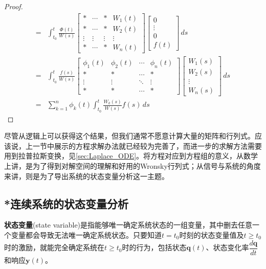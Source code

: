 \documentclass{ctexbook}
\begin{document}
\begin{proof}
\begin{align*}
        =&\int_{t_0}^t \frac{\Phi(t)}{W(s)}\begin{bmatrix}
        * & \cdots & * & W_1(t)\\
        * &  \cdots & * & W_2(t)\\
        \vdots & \vdots & \vdots & \vdots\\
        * &  \cdots & * & W_n(t)
        \end{bmatrix}\begin{bmatrix}
        0\\
        \vdots\\
        0\\
        f(t)
        \end{bmatrix}\,ds\\
        =&\int_{t_0}^t \frac{f(s)}{W(s)}\begin{bmatrix}
        \phi_1(t) & \phi_2(t) & \cdots & \phi_n(t)\\
        * & * & \cdots & *\\
        \vdots & \vdots & \ddots & \vdots\\
        * & * & \cdots & *
        \end{bmatrix}\begin{bmatrix}
        W_1(s)\\
        W_2(s)\\
        \vdots\\
        W_n(s)
        \end{bmatrix}\,ds\\
        =&\sum_{k=1}^n \phi_k(t)\int_{t_0}^t \frac{W_k(s)}{W(s)}f(s)\,ds
    \end{align*}
\end{proof}
\begin{remark}
    尽管从逻辑上可以获得这个结果，但我们通常不愿意计算大量的矩阵和行列式。应该说，上一节中展示的方程求解办法就已经较为完善了，而进一步的求解方法需要用到拉普拉斯变换，见\ref{sec:Laplace_ODE}。将方程对应到方程组的意义，从数学上讲，是为了得到对解空间的理解和好用的Wronsky行列式；从信号与系统的角度来讲，则是为了导出系统的状态变量分析这一主题。
\end{remark}

\subsection{*连续系统的状态变量分析}\label{sub:state_variable_analysis}

\begin{definition}[状态变量]
    \textbf{状态变量}(state variable)是指能够唯一确定系统状态的一组变量，其中删去任意一个变量都会导致无法唯一确定系统状态。只要知道$t=t_0$时刻的状态变量值及$t\geq t_0$时的激励，就能完全确定系统在$t\geq t_0$时的行为，包括状态$\mathbf{q}(t)$、状态变化率$\dfrac{d\mathbf{q}}{dt}$和响应$\mathbf{y}(t)$。
\end{definition}
\end{document}
